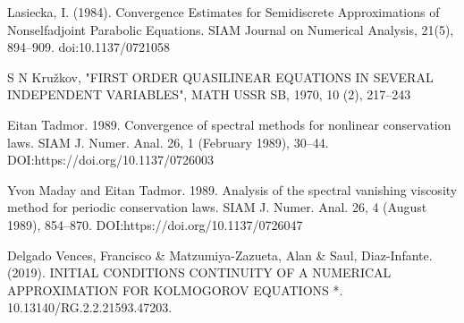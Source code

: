 \begin{thebibliography}{X}
 Lasiecka, I. (1984). Convergence Estimates for Semidiscrete Approximations of Nonselfadjoint Parabolic Equations. SIAM Journal on Numerical Analysis, 21(5), 894–909. doi:10.1137/0721058 

 S N Kružkov, "FIRST ORDER QUASILINEAR EQUATIONS IN SEVERAL INDEPENDENT VARIABLES", MATH USSR SB, 1970, 10 (2), 217–243 

 Eitan Tadmor. 1989. Convergence of spectral methods for nonlinear conservation laws. SIAM J. Numer. Anal. 26, 1 (February 1989), 30–44. DOI:https://doi.org/10.1137/0726003

 Yvon Maday and Eitan Tadmor. 1989. Analysis of the spectral vanishing viscosity method for periodic conservation laws. SIAM J. Numer. Anal. 26, 4 (August 1989), 854–870. DOI:https://doi.org/10.1137/0726047

 Delgado Vences, Francisco \& Matzumiya-Zazueta, Alan \& Saul, Diaz-Infante. (2019). INITIAL CONDITIONS CONTINUITY OF A NUMERICAL APPROXIMATION FOR KOLMOGOROV EQUATIONS *. 10.13140/RG.2.2.21593.47203.

\end{thebibliography}